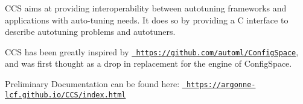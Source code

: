 \label{index_md_README}%
%
 CCS aims at providing interoperability between autotuning frameworks and applications with auto-\/tuning needs. It does so by providing a C interface to describe autotuning problems and autotuners.

CCS has been greatly inspired by \href{https://github.com/automl/ConfigSpace}{\texttt{ https\+://github.\+com/automl/\+Config\+Space}}, and was first thought as a drop in replacement for the engine of Config\+Space.

Preliminary Documentation can be found here\+: \href{https://argonne-lcf.github.io/CCS/index.html}{\texttt{ https\+://argonne-\/lcf.\+github.\+io/\+CCS/index.\+html}} 